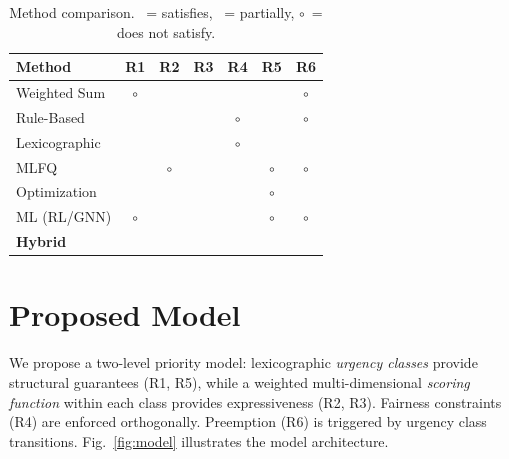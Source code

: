 \documentclass[conference]{IEEEtran}
\begin{document}
\begin{table}[t]
\caption{Method comparison. \CIRCLE~= satisfies, \LEFTcircle~= partially, $\circ$~= does not satisfy.}
\label{tab:comparison}
\centering
\small
\newcommand{\full}{\CIRCLE}
\newcommand{\half}{\LEFTcircle}
\newcommand{\none}{$\circ$}
\begin{tabular}{lcccccc}
\toprule
\textbf{Method} & \textbf{R1} & \textbf{R2} & \textbf{R3} & \textbf{R4} & \textbf{R5} & \textbf{R6} \\
\midrule
Weighted Sum    & \none & \full & \full & \half & \full & \none \\
Rule-Based      & \full & \half & \half & \none & \full & \none \\
Lexicographic   & \full & \half & \half & \none & \full & \half \\
MLFQ            & \half & \none & \half & \full & \none & \none \\
Optimization    & \full & \full & \full & \full & \none & \half \\
ML (RL/GNN)     & \none & \full & \full & \half & \none & \none \\
\midrule
\textbf{Hybrid} & \full & \full & \full & \full & \full & \full \\
\bottomrule
\end{tabular}
\end{table}

\section{Proposed Model}
\label{sec:model}

We propose a two-level priority model: lexicographic \emph{urgency classes} provide structural guarantees (R1, R5), while a weighted multi-dimensional \emph{scoring function} within each class provides expressiveness (R2, R3). Fairness constraints (R4) are enforced orthogonally. Preemption (R6) is triggered by urgency class transitions. Fig.~\ref{fig:model} illustrates the model architecture.
\end{document}
